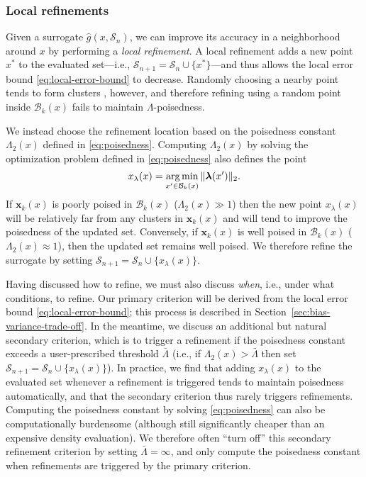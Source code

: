 \subsubsection{Local refinements}
\label{sec:localrefinements}
Given a surrogate $\hat{g}(x, \mathcal{S}_n)$, we can improve its accuracy in a neighborhood around $x$ by performing a \textit{local refinement}. A local refinement adds a new point $x^{*}$ to the evaluated set---i.e., $\mathcal{S}_{n+1} = \mathcal{S}_n \cup \{x^{*}\}$---and thus allows the local error bound \eqref{eq:local-error-bound} to decrease. Randomly choosing a nearby point tends to form clusters \citep{RoteTichy1996}, however, and therefore refining using a random point inside $\mathcal{B}_k(x)$ fails to maintain $\Lambda$-poisedness.

We instead choose the refinement location based on the poisedness constant $\Lambda_2(x)$ defined in \eqref{eq:poisedness}. Computing $\Lambda_2(x)$ by solving the optimization problem defined in \eqref{eq:poisedness} also defines the point 
\begin{equation}
    x_{\lambda}(x) = \operatorname*{arg\,min}_{x^{\prime} \in \mathcal{B}_k(x)}{\|\boldsymbol{\lambda}(x^{\prime})\|_2}.
    \label{eq:poisedness-refinement-location}
\end{equation}
If $\boldsymbol{x}_k(x)$ is poorly poised in $\mathcal{B}_k(x)$ ($\Lambda_2(x) \gg 1$) then the new point $x_{\lambda}(x)$ will be relatively far from any clusters in $\boldsymbol{x}_k(x)$ and will tend to improve the poisedness of the updated set. Conversely, if $\boldsymbol{x}_k(x)$ is well poised in $\mathcal{B}_k(x)$ ($\Lambda_2(x) \approx 1$), then the updated set remains well poised. We therefore refine the surrogate by setting $\mathcal{S}_{n+1} = \mathcal{S}_n \cup \{x_{\lambda}(x)\}$.

Having discussed {how} to refine, we must also discuss \textit{when}, i.e., under what conditions, to refine. Our primary criterion will be derived from the local error bound \eqref{eq:local-error-bound}; this process is described in Section~\ref{sec:bias-variance-trade-off}. In the meantime, we discuss an additional but natural secondary criterion, which is to trigger a refinement if the poisedness constant exceeds a user-prescribed threshold $\bar{\Lambda}$ (i.e., if $\Lambda_2(x) > \bar{\Lambda}$ then set $\mathcal{S}_{n+1} = \mathcal{S}_n \cup \{x_{\lambda}(x)\}$). In practice, we find that adding $x_{\lambda}(x)$ to the evaluated set whenever a refinement is triggered tends to maintain poisedness automatically, and that the secondary criterion thus rarely triggers refinements. Computing the poisedness constant by solving \eqref{eq:poisedness} can also be computationally burdensome (although still significantly cheaper than an expensive density evaluation). We therefore often ``turn off'' this secondary refinement criterion by setting $\bar{\Lambda} = \infty$, and only compute the poisedness constant when refinements are triggered by the primary criterion. 

